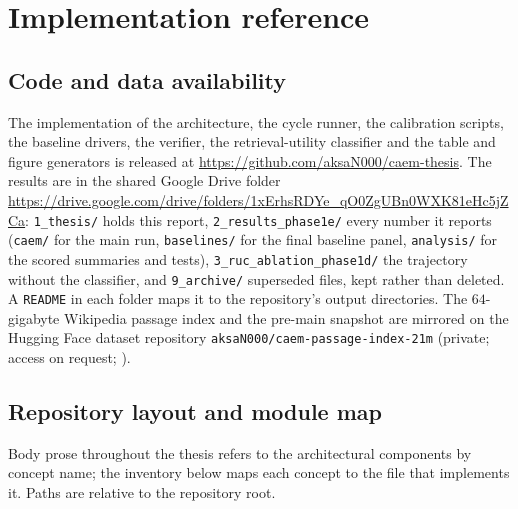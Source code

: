 
\chapter{Implementation reference}
\label{app:implementation}

\section{Code and data availability}
\label{app:code-data-availability}

The implementation of the architecture, the cycle runner, the calibration scripts, the baseline drivers, the verifier, the retrieval-utility classifier and the table and figure generators is released at \url{https://github.com/aksaN000/caem-thesis}. The results are in the shared Google Drive folder \url{https://drive.google.com/drive/folders/1xErhsRDYe_qO0ZgUBn0WXK81eHc5jZCa}: \texttt{1\_thesis/} holds this report, \texttt{2\_results\_phase1e/} every number it reports (\texttt{caem/} for the main run, \texttt{baselines/} for the final baseline panel, \texttt{analysis/} for the scored summaries and tests), \texttt{3\_ruc\_ablation\_phase1d/} the trajectory without the classifier, and \texttt{9\_archive/} superseded files, kept rather than deleted. A \texttt{README} in each folder maps it to the repository's output directories. The $64$-gigabyte Wikipedia passage index and the pre-main snapshot are mirrored on the Hugging Face dataset repository \texttt{aksaN000/caem-passage-index-21m} (private; access on request; ).

\section{Repository layout and module map}
\label{app:repo-layout}

Body prose throughout the thesis refers to the architectural components by concept name; the inventory below maps each concept to the file that implements it. Paths are relative to the repository root.

